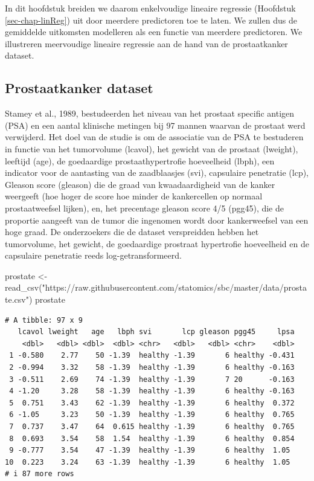 \documentclass[
  dutch,
  letterpaper,
  12pt]{book}
\newenvironment{Shaded}{\begin{snugshade}}{\end{snugshade}}
\newcommand{\FunctionTok}[1]{\textcolor[rgb]{0.28,0.35,0.67}{#1}}
\newcommand{\NormalTok}[1]{\textcolor[rgb]{0.00,0.23,0.31}{#1}}
\newcommand{\OtherTok}[1]{\textcolor[rgb]{0.00,0.23,0.31}{#1}}
\newcommand{\StringTok}[1]{\textcolor[rgb]{0.13,0.47,0.30}{#1}}
\theoremstyle{definition}
\theoremstyle{definition}
\theoremstyle{definition}
\theoremstyle{remark}
\begin{document}
In dit hoofdstuk breiden we daarom enkelvoudige lineaire regressie
(Hoofdstuk \ref{sec-chap-linReg}) uit door meerdere predictoren toe te
laten. We zullen dus de gemiddelde uitkomsten modelleren als een functie
van meerdere predictoren. We illustreren meervoudige lineaire regressie
aan de hand van de prostaatkanker dataset.

\subsection{Prostaatkanker dataset}\label{sec-prostate}

Stamey et al., 1989, bestudeerden het niveau van het prostaat specific
antigen (PSA) en een aantal klinische metingen bij 97 mannen waarvan de
prostaat werd verwijderd. Het doel van de studie is om de associatie van
de PSA te bestuderen in functie van het tumorvolume (lcavol), het
gewicht van de prostaat (lweight), leeftijd (age), de goedaardige
prostaathypertrofie hoeveelheid (lbph), een indicator voor de aantasting
van de zaadblaasjes (svi), capsulaire penetratie (lcp), Gleason score
(gleason) die de graad van kwaadaardigheid van de kanker weergeeft (hoe
hoger de score hoe minder de kankercellen op normaal prostaatweefsel
lijken), en, het precentage gleason score 4/5 (pgg45), die de proportie
aangeeft van de tumor die ingenomen wordt door kankerweefsel van een
hoge graad. De onderzoekers die de dataset verspreidden hebben het
tumorvolume, het gewicht, de goedaardige prostraat hypertrofie
hoeveelheid en de capsulaire penetratie reeds log-getransformeerd.

\begin{Shaded}
\begin{Highlighting}[]
\NormalTok{prostate }\OtherTok{\textless{}{-}} \FunctionTok{read\_csv}\NormalTok{(}\StringTok{"https://raw.githubusercontent.com/statomics/sbc/master/data/prostate.csv"}\NormalTok{)}
\NormalTok{prostate}
\end{Highlighting}
\end{Shaded}

\begin{verbatim}
# A tibble: 97 x 9
   lcavol lweight   age   lbph svi       lcp gleason pgg45     lpsa
    <dbl>   <dbl> <dbl>  <dbl> <chr>   <dbl>   <dbl> <chr>    <dbl>
 1 -0.580    2.77    50 -1.39  healthy -1.39       6 healthy -0.431
 2 -0.994    3.32    58 -1.39  healthy -1.39       6 healthy -0.163
 3 -0.511    2.69    74 -1.39  healthy -1.39       7 20      -0.163
 4 -1.20     3.28    58 -1.39  healthy -1.39       6 healthy -0.163
 5  0.751    3.43    62 -1.39  healthy -1.39       6 healthy  0.372
 6 -1.05     3.23    50 -1.39  healthy -1.39       6 healthy  0.765
 7  0.737    3.47    64  0.615 healthy -1.39       6 healthy  0.765
 8  0.693    3.54    58  1.54  healthy -1.39       6 healthy  0.854
 9 -0.777    3.54    47 -1.39  healthy -1.39       6 healthy  1.05 
10  0.223    3.24    63 -1.39  healthy -1.39       6 healthy  1.05 
# i 87 more rows
\end{verbatim}
\end{document}
